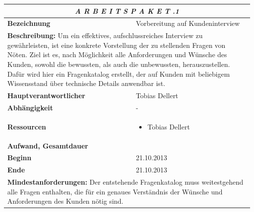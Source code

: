 \documentclass[fontsize=12pt,paper=a4,twoside]{scrartcl}
\begin{document}
\begin{tabular}{p{7.5cm}|p{7.5cm}}\toprule
\multicolumn{2}{c}{\textbf{\textit{A R B E I T S P A K E T \quad 2.1.1}}} \\ \toprule \hline
\textbf{Bezeichnung} & Vorbereitung auf Kundeninterview\\\hline
\multicolumn{2}{p{15cm}}{\textbf{Beschreibung:} 
\newline 
Um ein effektives, aufschlussreiches Interview zu gewährleisten, ist eine konkrete Vorstellung der zu stellenden Fragen von Nöten. Ziel ist es, nach Möglichkeit alle Anforderungen und Wünsche des Kunden, sowohl die bewussten, als auch die unbewussten, herauszustellen. Dafür wird hier ein Fragenkatalog erstellt, der auf Kunden mit beliebigem Wissensstand über technische Details anwendbar ist.}  \\\hline
\textbf{Hauptverantwortlicher} & Tobias Dellert \\\hline
\textbf{Abhängigkeit} & -\\\hline
\textbf{Ressourcen} & \begin{itemize} 
\itemsep0pt
\item Tobias Dellert
\end{itemize} \\\hline
\textbf{Aufwand, Gesamtdauer} & \\\hline
\textbf{Beginn} & 21.10.2013 \\\hline
\textbf{Ende} & 21.10.2013\\\hline
\multicolumn{2}{p{15cm}}{\textbf{Mindestanforderungen: } \newline
Der entstehende Fragenkatalog muss weitestgehend alle Fragen enthalten, die für ein genaues Verständnis der Wünsche und Anforderungen des Kunden nötig sind. }  \\ \toprule
\end{tabular} \\\\
\end{document}
